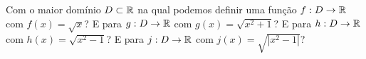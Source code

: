 Com o maior domínio $D\subset\mathbb{R}$ na qual podemos definir uma função $f:D\rightarrow\mathbb{R}$
com $f(x)=\sqrt{x}$? E para $g:D\rightarrow\mathbb{R}$ com $g(x)=\sqrt{x^2+1}$? E para $h:D\rightarrow\mathbb{R}$
com $h(x)=\sqrt{x^2-1}$? E para $j:D\rightarrow\mathbb{R}$ com $j(x)=\sqrt{|x^2-1|}$?

